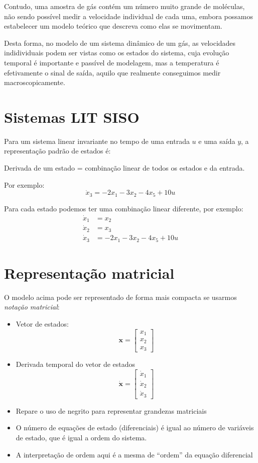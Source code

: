 \documentclass[
]{book}
\begin{document}
Contudo, uma amostra de gás contém um número muito grande de moléculas, não sendo possível medir a velocidade individual de cada uma, embora possamos estabelecer um modelo teórico que descreva como elas se movimentam.

Desta forma, no modelo de um sistema dinâmico de um gás, as velocidades indidividuais podem ser vistas como os estados do sistema, cuja evolução temporal é importante e passível de modelagem, mas a temperatura é efetivamente o sinal de saída, aquilo que realmente conseguimos medir macroscopicamente.

\hypertarget{sistemas-lit-siso}{%
\section{Sistemas LIT SISO}\label{sistemas-lit-siso}}

Para um sistema linear invariante no tempo de uma entrada \(u\) e uma saída \(y\), a representação padrão de estados é:

Derivada de um estado = combinação linear de todos os estados e da entrada.

Por exemplo:
\[
  \dot{x}_3 = -2x_1-3x_2-4x_5 + 10u
\]

Para cada estado podemos ter uma combinação linear diferente, por exemplo:
\[
  \begin{aligned}
  \dot{x}_1 &= x_2\\
  \dot{x}_2 &= x_3\\
  \dot{x}_3 &= -2x_1-3x_2-4x_5 + 10u
  \end{aligned}
\]

\hypertarget{representauxe7uxe3o-matricial}{%
\section{Representação matricial}\label{representauxe7uxe3o-matricial}}

O modelo acima pode ser representado de forma mais compacta se usarmos \emph{notação matricial}:

\begin{itemize}
\item
  Vetor de estados:
  \[
  \mathbf{x}=\left[\begin{matrix}x_{1}\\x_{2}\\x_{3}\end{matrix}\right]
  \]
\item
  Derivada temporal do vetor de estados
  \[
  \dot{\mathbf{x}}=\left[\begin{matrix}\dot{x}_1\\\dot{x}_2\\\dot{x}_3\end{matrix}\right]
  \]
\item
  Repare o uso de negrito para representar grandezas matriciais
\item
  O número de equações de estado (diferenciais) é igual ao número de variáveis de estado, que é igual a ordem do sistema.
\item
  A interpretação de ordem aqui é a mesma de ``ordem'' da equação diferencial
\end{itemize}
\end{document}
